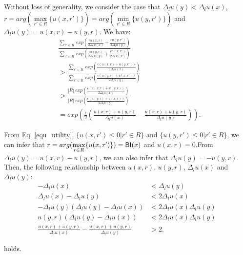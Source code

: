 \documentclass{article}
\begin{document}
Without loss of generality, we consider the case that $\Delta_{l}u(y) < \Delta_{l}u(x)$, $r = arg(\max\limits_{r' \in R}\{u(x,r')\}) = arg(\min\limits_{r' \in R}\{u(y,r')\})$ and $\Delta_{l}u(y) = u(x,r) - u(y,r)$. We have:
\begin{equation*}
\begin{split}
& \frac
{\sum\limits_{r' \in R}\ exp(\frac{\epsilon u(x,r)}{2 \Delta_{l}u(x)} 
+ \frac{\epsilon u(y,r')}{2 \Delta_{l}u(y)})}
{\sum\limits_{r' \in R}\ exp(\frac{\epsilon u(y,r)}{2 \Delta_{l}u(y)} 
+ \frac{\epsilon u(x,r')}{2 \Delta_{l}u(x)})}\\
& > \frac
{\sum\limits_{r' \in R}\ exp(\frac{\epsilon (u(x,r) + u(y,r'))}{2 \Delta_{l}u(x)})}
{\sum\limits_{r' \in R}\ exp(\frac{\epsilon (u(y,r) + u(x,r'))}{2 \Delta_{l}u(y)})}\\
& > \frac
{|R|\ exp(\frac{\epsilon (u(x,r) + u(y,r))}{2 \Delta_{l}u(x)})}
{|R|\ exp(\frac{\epsilon (u(y,r) + u(x,r))}{2 \Delta_{l}u(y)})}\\
& = exp(\frac{\epsilon}{2} (\frac{u(x,r) + u(y,r)}{\Delta_{l}u(x)} - \frac{u(x,r) + u(y,r)}{\Delta_{l}u(y)})).
\end{split}
\end{equation*}

From Eq. \ref{equ_utility}, $\{u(x,r') \leq 0|r' \in R\}$ and $\{u(y,r') \leq 0|r' \in R\}$, we can infer that $r = arg(\max\limits_{r \in R}\{u(x,r')\}) = \mathsf{BI}(x)$ and $u(x,r) = 0$.From $\Delta_{l}u(y) = u(x,r) - u(y,r)$, we can also infer that $\Delta_{l}u(y) = - u(y,r)$. Then, the following relationship between $u(x,r)$, $u(y,r)$, $\Delta_{l}u(x)$ and $\Delta_{l}u(y)$:
\begin{equation*}
\begin{split}
- \Delta_{l}u(x) & < \Delta_{l}u(y) \\
\Delta_{l}u(x) - \Delta_{l}u(y) & < 2 \Delta_{l}u(x) \\
- \Delta_{l}u(y) (\Delta_{l}u(y) - \Delta_{l}u(x)) 
& < 2 \Delta_{l}u(x) \Delta_{l}u(y) \\
u(y,r) (\Delta_{l}u(y) - \Delta_{l}u(x)) 
& < 2 \Delta_{l}u(x) \Delta_{l}u(y) \\
\frac{u(x,r) + u(y,r)}{\Delta_{l}u(x)} - \frac{u(x,r) + u(y,r)}{\Delta_{l}u(y)} & > 2.
\end{split}
\end{equation*}

holds.
 
\end{document}
